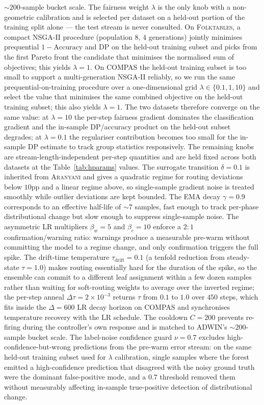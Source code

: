 \documentclass[sigconf,anonymous,review]{acmart}
\begin{document}
$\sim$$200$-sample bucket scale.
The fairness weight $\lambda$ is the only knob with a non-geometric calibration and is selected per dataset on a held-out portion of the training split
alone --- the test stream is never consulted. On \textsc{Folktables}, a compact NSGA-II procedure (population $8$, $4$ generations) jointly minimises
prequential $1{-}\mathrm{Accuracy}$ and DP on the held-out training subset and picks from the first Pareto front the candidate that minimises the
normalised sum of objectives; this yields $\lambda=1$. On \textsc{COMPAS} the held-out training subset is too small to support a multi-generation NSGA-II
reliably, so we run the same prequential-on-training procedure over a one-dimensional grid $\lambda \in \{0.1, 1, 10\}$ and select the value that
minimises the same combined objective on the held-out training subset; this also yields $\lambda=1$. The two datasets therefore converge on the same
value: at $\lambda=10$ the per-step fairness gradient dominates the classification gradient and the in-sample DP/accuracy product on the held-out subset
degrades; at $\lambda=0.1$ the regulariser contribution becomes too small for the in-sample DP estimate to track group statistics responsively.
The remaining knobs are stream-length-independent per-step quantities and are held fixed across both datasets at the Table~\ref{tab:hparams} values.
The surrogate transition $\delta=0.1$ is inherited from \textsc{Aranyani} and gives a quadratic regime for routing deviations below $10$pp and a
linear regime above, so single-sample gradient noise is treated smoothly while outlier deviations are kept bounded. The EMA decay $\gamma=0.9$
corresponds to an effective half-life of $\sim 7$ samples, fast enough to track per-phase distributional change but slow enough to suppress
single-sample noise. The asymmetric LR multipliers $\beta_w{=}5$ and $\beta_c{=}10$ enforce a $2{:}1$ confirmation/warning ratio: warnings produce
a measurable pre-warm without committing the model to a regime change, and only confirmation triggers the full spike. The drift-time temperature
$\tau_{\mathrm{drift}}=0.1$ (a tenfold reduction from steady-state $\tau=1.0$) makes routing essentially hard for the duration of the spike, so the
ensemble can commit to a different leaf assignment within a few dozen samples rather than waiting for soft-routing weights to average over the
inverted regime; the per-step anneal $\Delta\tau=2{\times}10^{-3}$ returns $\tau$ from $0.1$ to $1.0$ over $450$ steps, which fits inside the
$\Delta=600$ LR decay horizon on \textsc{COMPAS} and synchronises temperature recovery with the LR schedule. The cooldown $C=200$ prevents
re-firing during the controller's own response and is matched to ADWIN's $\sim 200$-sample bucket scale. The label-noise confidence guard $\nu=0.7$
excludes high-confidence-but-wrong predictions from the pre-warm error stream: on the same held-out training subset used for $\lambda$ calibration,
single samples where the forest emitted a high-confidence prediction that disagreed with the noisy ground truth were the dominant false-positive mode,
and a $0.7$ threshold removed them without measurably affecting in-sample true-positive detection of distributional change.
\end{document}
